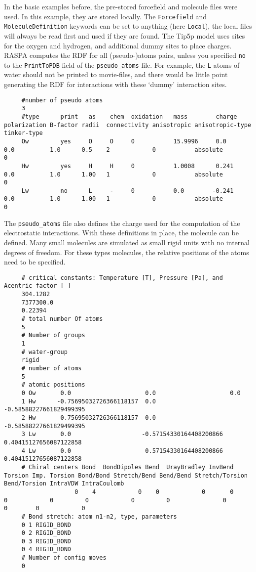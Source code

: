 In the basic examples before, the pre-stored forcefield and molecule files were used.
In this example, they are stored locally. The \verb+Forcefield+ and \verb+MoleculeDefinition+ keywords
can be set to anything (here \verb+Local+), the local files will always be read first and used if they are found.
The Tip5p model uses sites for the oxygen and hydrogen, and additional dummy sites to place charges.
RASPA computes the RDF for all (pseudo-)atoms pairs,
unless you specified \verb+no+ to the \verb+PrintToPDB+-field of the \verb+pseudo_atoms+ file.
For example, the \verb+L+-atoms of water should not be printed to movie-files, and there would be little point generating
the RDF for interactions with these `dummy' interaction sites.
\begin{tiny}
\begin{verbatim}
     #number of pseudo atoms
     3
     #type      print   as    chem  oxidation   mass        charge   polarization B-factor radii  connectivity anisotropic anisotropic-type   tinker-type
     Ow         yes     O     O     0           15.9996     0.0      0.0          1.0      0.5    2            0           absolute           0
     Hw         yes     H     H     0           1.0008      0.241    0.0          1.0      1.00   1            0           absolute           0
     Lw         no      L     -     0           0.0        -0.241    0.0          1.0      1.00   1            0           absolute           0
\end{verbatim}
\end{tiny}
The \verb+pseudo_atoms+ file also defines the charge used for the computation of the electrostatic interactions.
With these definitions in place, the molecule can be defined. Many small molecules are simulated as small rigid units with no internal degrees of freedom.
For these types molecules, the relative positions of the atoms need to be specified.
\begin{tiny}
\begin{verbatim}
     # critical constants: Temperature [T], Pressure [Pa], and Acentric factor [-]
     304.1282
     7377300.0
     0.22394
     # total number Of atoms
     5
     # Number of groups
     1
     # water-group
     rigid
     # number of atoms
     5
     # atomic positions
     0 Ow       0.0                     0.0                     0.0
     1 Hw      -0.75695032726366118157  0.0                    -0.58588227661829499395
     2 Hw       0.75695032726366118157  0.0                    -0.58588227661829499395
     3 Lw       0.0                    -0.57154330164408200866  0.40415127656087122858
     4 Lw       0.0                     0.57154330164408200866  0.40415127656087122858
     # Chiral centers Bond  BondDipoles Bend  UrayBradley InvBend  Torsion Imp. Torsion Bond/Bond Stretch/Bend Bend/Bend Stretch/Torsion Bend/Torsion IntraVDW IntraCoulomb
                    0    4            0    0            0       0        0            0         0            0         0               0            0        0            0
     # Bond stretch: atom n1-n2, type, parameters
     0 1 RIGID_BOND
     0 2 RIGID_BOND
     0 3 RIGID_BOND
     0 4 RIGID_BOND
     # Number of config moves
     0
\end{verbatim}
\end{tiny}
